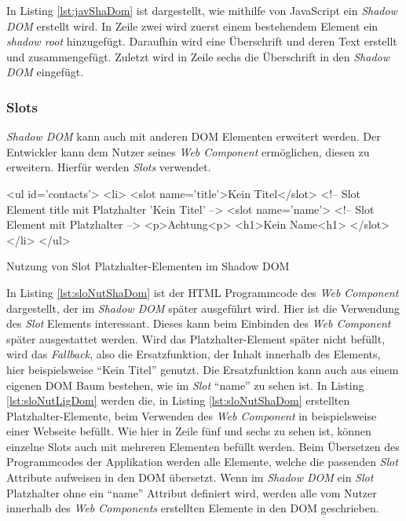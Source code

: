 \documentclass[12pt, paper=a4, bibtotoc, toc=listof, headsepline=true]{scrreprt}
\begin{document}
		In Listing \ref{lst:javShaDom} ist dargestellt, wie mithilfe von JavaScript ein \emph{Shadow \ac{DOM}} erstellt wird. In Zeile zwei wird zuerst einem bestehendem Element ein \emph{shadow root} hinzugefügt. Daraufhin wird eine Überschrift und deren Text erstellt und zusammengefügt. Zuletzt wird in Zeile sechs die Überschrift in den \emph{Shadow \ac{DOM}} eingefügt.
			\subsubsection{Slots}
			\emph{Shadow \ac{DOM}} kann auch mit anderen \ac{DOM} Elementen erweitert werden. Der Entwickler kann dem Nutzer seines \emph{Web Component} ermöglichen, diesen zu erweitern. Hierfür werden \emph{Slots} verwendet. 
			\begin{listing}
				\begin{HTMLcode*}{}
<ul id='contacts'>
   <li>
      <slot name='title'>Kein Titel</slot> <!-- Slot Element title mit Platzhalter 'Kein Titel' -->
      <slot name='name'> <!-- Slot Element mit Platzhalter -->
         <p>Achtung<p>
         <h1>Kein Name<h1>
      </slot>
   </li>
</ul>
				\end{HTMLcode*}
				\caption[Slot Elemente im Shadow DOM]{Nutzung von Slot Platzhalter-Elementen im Shadow DOM}
				\label{lst:sloNutShaDom}
			\end{listing}
			In Listing \ref{lst:sloNutShaDom} ist der \ac{HTML} Programmcode des \emph{Web Component} dargestellt, der im \emph{Shadow \ac{DOM}} später ausgeführt wird. Hier ist die Verwendung des \emph{Slot} Elements interessant. Dieses kann beim Einbinden des \emph{Web Component} später ausgestattet werden. Wird das Platzhalter-Element später nicht befüllt, wird das \emph{Fallback}, also die Ersatzfunktion, der Inhalt innerhalb des Elements, hier beispielsweise \enquote{Kein Titel} genutzt. Die Ersatzfunktion kann auch aus einem eigenen \ac{DOM} Baum bestehen, wie im \emph{Slot} \enquote{name} zu sehen ist\cite{Bidelman2016}. In Listing \ref{lst:sloNutLigDom} werden die, in Listing \ref{lst:sloNutShaDom} erstellten Platzhalter-Elemente, beim Verwenden des \emph{Web Component} in beispielsweise einer Webseite befüllt. Wie hier in Zeile fünf und sechs zu sehen ist, können einzelne Slots auch mit mehreren Elementen befüllt werden. Beim Übersetzen des Programmcodes der Applikation werden alle Elemente, welche die passenden \emph{Slot} Attribute aufweisen in den \ac{DOM} übersetzt. Wenn im \emph{Shadow \ac{DOM}} ein \emph{Slot} Platzhalter ohne ein \enquote{name} Attribut definiert wird, werden alle vom Nutzer innerhalb des \emph{Web Components} erstellten Elemente in den \ac{DOM} geschrieben.
\end{document}
